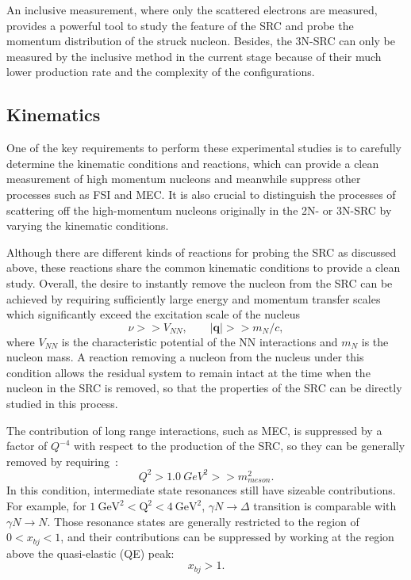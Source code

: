    An inclusive measurement, where only the scattered electrons are measured, provides a powerful tool to study the feature of the SRC and probe the momentum distribution of the struck nucleon. Besides, the 3N-SRC can only be measured by the inclusive method in the current stage because of their much lower production rate and the complexity of the configurations.

\subsection{Kinematics}
  One of the key requirements to perform these experimental studies is to carefully determine the kinematic conditions and reactions, which can provide a clean measurement of high momentum nucleons and meanwhile suppress other processes such as FSI and MEC. It is also crucial to distinguish the processes of scattering off the high-momentum nucleons originally in the 2N- or 3N-SRC by varying the kinematic conditions.
    
 Although there are different kinds of reactions for probing the SRC as discussed above, these reactions share the common kinematic conditions to provide a clean study. Overall, the desire to instantly remove the nucleon from the SRC can be achieved by requiring sufficiently large energy and momentum transfer scales which significantly exceed the excitation scale of the nucleus~\cite{Frankfurt1981215,Frankfurt_misak}
\begin{equation}
  \nu >> V_{NN}, \qquad |\mathbf{q}| >> m_{N}/c,
  \label{src_condition1}
\end{equation}
where $V_{NN}$ is the characteristic potential of the NN interactions and $m_{N}$ is the nucleon mass. A reaction removing a nucleon from the nucleus under this condition allows the residual system to remain intact at the time when the nucleon in the SRC is removed, so that the properties of the SRC can be directly studied in this process.

The contribution of long range interactions, such as MEC, is suppressed by a factor of $Q^{-4}$ with respect to the production of the SRC, so they can be generally removed by requiring~\cite{M_Sargsian_JPG_29_2003}:
\begin{equation}
  Q^{2} > 1.0~GeV^{2} >> m_{meson}^{2}.
  \label{src_condition2}
\end{equation}
In this condition, intermediate state resonances still have sizeable contributions. For example, for $\mathrm{1~GeV^{2}<Q^{2}<4~GeV^{2}}$, $\gamma N\rightarrow \Delta$ transition is comparable with $\gamma N\rightarrow N$. Those resonance states are generally restricted to the region of $0<x_{bj}<1$, and their contributions can be suppressed by working at the region above the quasi-elastic (QE) peak:
\begin{equation}
  x_{bj} > 1.
  \label{src_condition3}
\end{equation}

